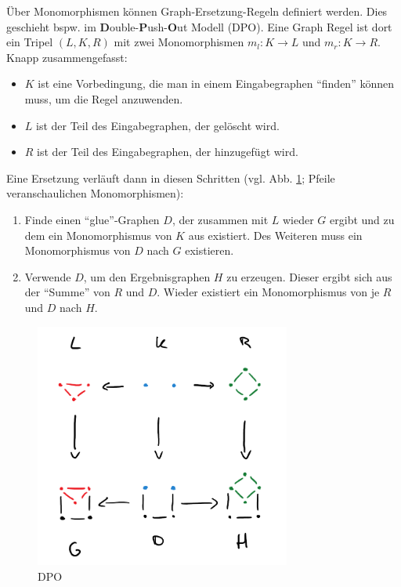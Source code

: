 \begin{remark}
    Über Monomorphismen können Graph-Ersetzung-Regeln definiert werden.
    Dies geschieht bspw. im \textbf{D}ouble-\textbf{P}ush-\textbf{O}ut Modell (DPO).
    Eine Graph Regel ist dort ein Tripel $ (L, K, R) $ mit zwei Monomorphismen $ m_l : K \to L $ und $ m_r : K \to R $.
    Knapp zusammengefasst:
    \begin{itemize}
        \item $ K $ ist eine Vorbedingung, die man in einem Eingabegraphen ``finden'' können muss, um die Regel anzuwenden.
        \item $ L $ ist der Teil des Eingabegraphen, der gelöscht wird.
        \item $ R $ ist der Teil des Eingabegraphen, der hinzugefügt wird.
    \end{itemize}

    Eine Ersetzung verläuft dann in diesen Schritten (vgl. Abb. \ref{fig:dpo}; Pfeile veranschaulichen Monomorphismen):
    \begin{enumerate}
        \item Finde einen ``glue''-Graphen $ D $, der zusammen mit $ L $ wieder $ G $ ergibt und zu dem ein Monomorphismus von $ K $ aus existiert.
        Des Weiteren muss ein Monomorphismus von $ D $ nach $ G $ existieren.
        \item Verwende $ D $, um den Ergebnisgraphen $ H $ zu erzeugen.
        Dieser ergibt sich aus der ``Summe'' von $ R $ und $ D $.
        Wieder existiert ein Monomorphismus von je $ R $ und $ D $ nach $ H $.
    \end{enumerate}

    \begin{figure}
        \centering
        \includegraphics[width=0.75\textwidth]{figures/dpo.png}
        \caption{DPO}
        \label{fig:dpo}
    \end{figure}
\end{remark}
